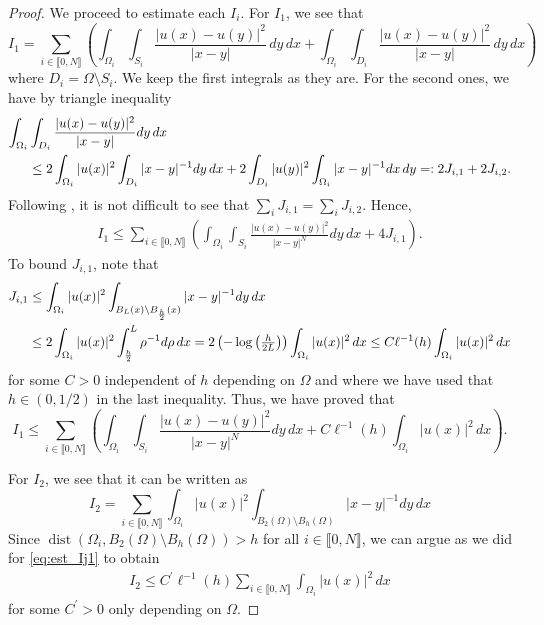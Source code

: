\documentclass[10 pt]{article}
\newcommand\inter[1]{\llbracket #1\rrbracket}
\numberwithin{equation}{section}
\def\dist{\operatorname{dist}}
\begin{document}
\begin{proof}
We proceed to estimate each $I_i$. For $I_1$, we see that  
%
\begin{equation*}
    I_1=\sum_{i\in\inter{0,N}}\left(\int_{\Omega_i}\int_{S_i}\frac{|u(x)-u(y)|^2}{|x-y|}\,dy\,dx+\int_{\Omega_i}\int_{D_i}\frac{|u(x)-u(y)|^2}{|x-y|}\,dy\,dx\right)
\end{equation*}
%
where $D_i=\Omega\setminus S_i$. We keep the first integrals as they are. For the second ones, we have by triangle inequality
%
\begin{align*}\notag
    \int_{\Omega_i}&\int_{D_i} \frac{|u(x)-u(y)|^2}{|x-y|}dy\,dx \\
    &\leq 2\int_{\Omega_i}|u(x)|^2\int_{D_i}|x-y|^{-1}dy\,dx+2\int_{D_i}|u(y)|^2\int_{\Omega_i}|x-y|^{-1}dx\,dy=:2J_{i,1}+2J_{i,2}.
\end{align*}
%
Following \cite[Prop. 1.2.24]{Bor17}, it is not difficult to see that $\sum_{i}{J_{i,1}}=\sum_{i}{J_{i,2}}$. Hence,
%
\begin{align*}
    I_1\leq \sum_{i\in\inter{0,N}}\left(\int_{\Omega_i}\int_{S_i}\frac{|u(x)-u(y)|^2}{|x-y|^N}dy\,dx+4 J_{i,1}\right).
\end{align*}
%
To bound $J_{i,1}$, note that
%
\begin{align}\notag
    J_{i,1}&\leq \int_{\Omega_i}|u(x)|^2\int_{B_{L}(x)\setminus B_{\frac{h}{2}}(x)}|x-y|^{-1}dy\,dx \\\label{eq:est_Ij1}
    &\leq 2\int_{\Omega_i}|u(x)|^2\int_{\frac{h}{2}}^{L}\rho^{-1}d\rho\,dx
    =2\left(-\log\left(\tfrac{h}{2L}\right)\right)\int_{\Omega_i}|u(x)|^2\,dx
    \leq C\ell^{-1} (h)\int_{\Omega_i}|u(x)|^2\,dx
\end{align}
%
for some $C>0$ independent of $h$ depending on $\Omega$ and where we have used that $h\in(0,1/2)$ in the last inequality. Thus, we have proved that
%
\begin{equation}\label{eq:est_I1_final}
    I_1\leq \sum_{i\in\inter{0,N}}\left(\int_{\Omega_i}\int_{S_i}\frac{|u(x)-u(y)|^2}{|x-y|^N}dy\,dx + C\ell^{-1}(h)\int_{\Omega_i}|u(x)|^2\,dx\right).
\end{equation}
%

For $I_2$, we see that it can be written as
%
\begin{equation*}
    I_2=\sum_{i\in\inter{0,N}}\int_{\Omega_i}|u(x)|^2\int_{B_2(\Omega)\setminus B_{h}(\Omega)}|x-y|^{-1}dy\,dx
\end{equation*}
%
Since $\dist(\Omega_i,B_2(\Omega)\setminus B_h(\Omega))>h$ for all $i\in\inter{0,N}$, we can argue as we did for \eqref{eq:est_Ij1} to obtain 
%
\begin{align}\label{eq:est_I2}
    I_2\leq C^\prime\ell^{-1}(h)\sum_{i\in\inter{0,N}}\int_{\Omega_i}|u(x)|^2\,dx
\end{align}
%
for some $C^\prime>0$ only depending on $\Omega$.


\end{proof}
\end{document}
